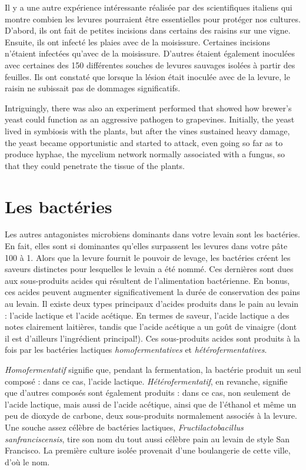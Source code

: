 Il y a une autre expérience intéressante réalisée par des scientifiques italiens qui montre combien les levures pourraient être essentielles pour protéger nos cultures. D'abord, ils ont fait de petites incisions dans certains des raisins sur une vigne. Ensuite, ils ont infecté les plaies avec de la moisissure. Certaines incisions n'étaient infectées qu'avec de la moisissure. D'autres étaient également inoculées avec certaines des 150 différentes souches de levures sauvages isolées à partir des feuilles. Ils ont constaté que lorsque la lésion était inoculée avec de la levure, le raisin ne subissait pas de dommages significatifs.

Intriguingly, there was also an experiment performed that showed how brewer's yeast could function as an aggressive pathogen to grapevines. Initially, the yeast lived in symbiosis with the plants, but after the vines sustained heavy damage, the yeast became opportunistic and started to attack, even going so far as to produce hyphae, the mycelium network normally associated with a fungus, so that they could penetrate the tissue of the plants.

\section{Les bactéries}

Les autres antagonistes microbiens dominants dans votre levain sont les bactéries. En fait, elles sont si dominantes qu'elles surpassent les levures dans votre pâte 100 à 1. Alors que la levure fournit le pouvoir de levage, les bactéries créent les saveurs distinctes pour lesquelles le levain a été nommé. Ces dernières sont dues aux sous-produits acides qui résultent de l'alimentation bactérienne. En bonus, ces acides peuvent augmenter significativement la durée de conservation des pains au levain.
Il existe deux types principaux d'acides produits dans le pain au levain : l'acide lactique et l'acide acétique. En termes de saveur, l'acide lactique a des notes clairement laitières, tandis que l'acide acétique a un goût de vinaigre (dont il est d'ailleurs l'ingrédient principal!). Ces sous-produits acides sont produits à la fois par les bactéries lactiques \emph{homofermentatives} et \emph{hétérofermentatives}.

\emph{Homofermentatif} signifie que, pendant la fermentation, la bactérie produit un seul composé : dans ce cas, l'acide lactique. \emph{Hétérofermentatif}, en revanche, signifie que d'autres composés sont également produits : dans ce cas, non seulement de l'acide lactique, mais aussi de l'acide acétique, ainsi que de l'éthanol et même un peu de dioxyde de carbone, deux sous-produits normalement associés à la levure. Une souche assez célèbre de bactéries lactiques, \emph{Fructilactobacillus sanfranciscensis}, tire son nom du tout aussi célèbre pain au levain de style San Francisco. La première culture isolée provenait d'une boulangerie de cette ville, d'où le nom.

